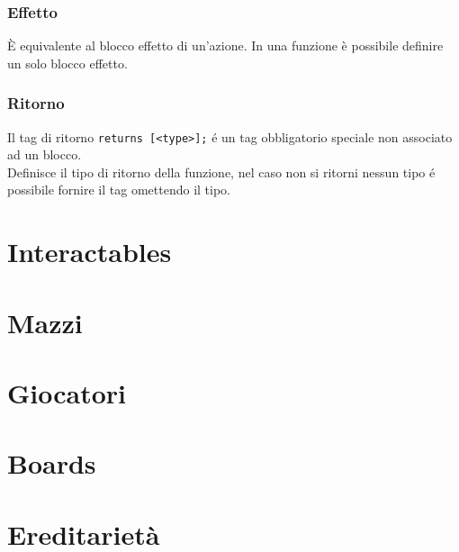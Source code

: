 \subsubsection{Effetto}
È equivalente al blocco effetto di un’azione. 
In una funzione è possibile definire un solo blocco effetto.

\subsubsection{Ritorno}
Il tag di ritorno \verb|returns [<type>];| é un tag obbligatorio speciale non associato ad un blocco. \\
Definisce il tipo di ritorno della funzione, nel caso non si ritorni nessun tipo é possibile 
fornire il tag omettendo il tipo.

\section{Interactables}

\section{Mazzi}

\section{Giocatori}

\section{Boards}

\section{Ereditarietà}





